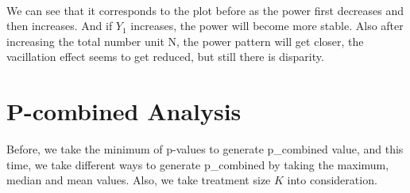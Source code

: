 \documentclass[10pt,english]{article}\usepackage{graphicx, color}
\numberwithin{equation}{section}
\numberwithin{figure}{section}
\begin{document}
\quad\\
We can see that it corresponds to the plot before as the power first decreases and then increases. And if $Y_1$ increases, the power will become more stable. Also after increasing the total number unit N, the power pattern will get closer, the vacillation effect seems to get reduced, but still there is disparity. 


\section{P-combined Analysis}
Before, we take the minimum of p-values to generate p\_combined value, and this time, we take different ways to generate p\_combined by taking the maximum, median and mean values. Also, we take treatment size $K$ into consideration.
\begin{figure}[htbp]
\centering{}
\subfigure[K=5]{
\begin{minipage}{8cm}

\end{minipage}}
\end{figure}
\end{document}
